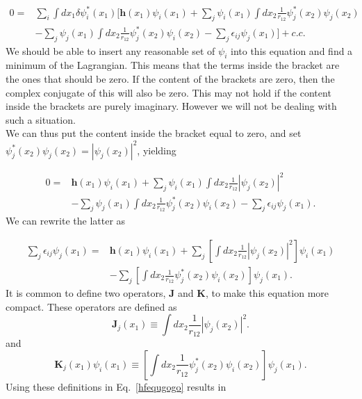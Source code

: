 \documentclass[a4paper,norsk,11pt,twoside]{report}
\begin{document}
\begin{align}
0 = & \sum_i \int dx_1 \delta \psi_i^*(x_1) 
\Big[
\textbf{h}(x_1) \psi_i(x_1)
+ \sum_j \psi_i(x_1) 
\int dx_2
\frac{1}{r_{12}} \psi_j^*(x_2) \psi_j(x_2)
\nonumber \\ &
- \sum_j \psi_j(x_1) \int dx_2 \frac{1}{r_{12}} \psi_j^*(x_2) \psi_i(x_2)
- \sum_j \epsilon_{ij} \psi_j(x_1)
\Big]
+ c.c .
\end{align}
We should be able to insert any reasonable set of $\psi_i$ into this equation
and find a minimum of the Lagrangian. This means that the terms inside the
bracket are the ones that should be zero. If the content of the
brackets are zero, then the complex conjugate of this will also be
zero. This may not hold if the content inside the brackets are purely
imaginary. However we will not be dealing with such a situation. \\

We can thus put the content inside the bracket equal to zero, and set
$\psi_j^*(x_2) \psi_j(x_2) = |\psi_j(x_2)|^2$, yielding

\begin{align}
0 = &
\textbf{h}(x_1) \psi_i(x_1)
+ \sum_j \psi_i(x_1) 
\int dx_2
\frac{1}{r_{12}} |\psi_j(x_2)|^2
\nonumber \\ &
- \sum_j \psi_j(x_1) \int dx_2 \frac{1}{r_{12}} \psi_j^*(x_2) \psi_i(x_2)
- \sum_j \epsilon_{ij} \psi_j(x_1) .
\end{align}
We can rewrite the latter as

\begin{align}
\sum_j \epsilon_{ij} \psi_j(x_1) = &
\textbf{h}(x_1) \psi_i(x_1)
+ \sum_j \left[ 
\int dx_2
\frac{1}{r_{12}} |\psi_j(x_2)|^2
\right]
\psi_i(x_1)
\nonumber \\ &
- \sum_j \left[ \int dx_2 \frac{1}{r_{12}} \psi_j^*(x_2) \psi_i(x_2) \right] \psi_j(x_1) .
\label{hfequgogo}
\end{align}
It is common to define two operators, $\textbf{J}$ and $\textbf{K}$, to make this equation more compact. 
These operators are defined as 
\begin{equation}
\textbf{J}_j(x_1) \equiv \int dx_2
\frac{1}{r_{12}} |\psi_j(x_2)|^2 . \label{JJdefinition}
\end{equation}
and
\begin{equation}
\textbf{K}_j(x_1) \psi_i(x_1) \equiv 
\left[ \int dx_2 \frac{1}{r_{12}} \psi_j^*(x_2) \psi_i(x_2) \right] \psi_j(x_1) .
\label{KKdefinition}
\end{equation}
Using these definitions in   Eq.~\eqref{hfequgogo} results in
\end{document}
